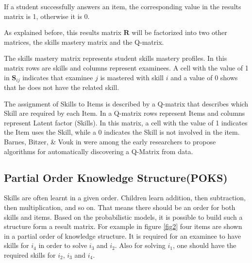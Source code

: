 \textit{} %
\DIFdelend \DIFaddbegin {}\DIFaddend If a student successfully answers an item, the corresponding value in the results matrix is 1, otherwise it is 0. \DIFaddbegin {}\DIFaddend 

As explained before, this results matrix $\mathbf{R}$ will be factorized into two other matrices, the skills mastery matrix and the Q-matrix.
\DIFdelbegin %
\DIFdelend 

The skills mastery matrix represents student skills mastery profiles. In this matrix rows are skills and columns represent examinees. A cell with the value of 1 in $\mathbf{S}_{ij}$ indicates that examinee $j$ is mastered with skill $i$ and a value of 0 shows that he does not have the related skill.

The assignment of Skills to Items is described by a Q-matrix that describes which Skill are required by each Item. In a Q-matrix rows represent Items and columns represent Latent factor (Skills). In this matrix, a cell with the value of 1 indicates the Item uses the Skill, while a 0 indicates the Skill is not involved in the item. Barnes, Bitzer, \& Vouk in \citep{barnes2005experimental} were among the early researchers to propose algorithms for automatically discovering a Q-Matrix from data.

\subsection{Partial Order Knowledge Structure(POKS)}

Skills \DIFdelbegin %
\DIFdelend are often learnt in a given order. Children learn addition, then subtraction, then multiplication, and so on. That means there should be an order for both skills and items. Based on the probabilistic models, it is possible to build such a structure form a result matrix. For example in figure \ref{fig2} four items are shown in a partial order of knowledge structure. It is required for an examinee to have skills for $i_{4}$ in order to solve $i_{3}$ and $i_{2}$. Also for solving $i_{1}$, one should have the required skills for $i_{2}$, $i_{3}$ and $i_{4}$.

